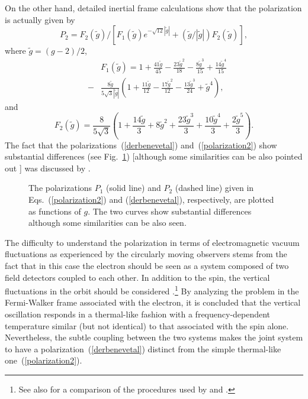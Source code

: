 \documentclass[12pt,nofootinbib,floatfix,aps,prd,showpacs,amsmath,amssymb,eqsecnum]{revtex4-2}
\let\cite\citep
\begin{document}
On the other hand, detailed inertial frame
calculations \cite{Derbenevetal73, Jackson76} 
show that the polarization is actually given by 
\begin{equation}
P_2= 
F_2(\tilde g )/
[F_1(\tilde g) e^{-\sqrt{12} |\tilde g|} + (\tilde g/|\tilde g|) F_2(\tilde g) ],
\label{derbenevetal}
\end{equation}
where 
$
\tilde g = (g-2)/2
$,
\begin{eqnarray}
& & 
F_1(\tilde g) 
= 
1+ \frac{41 \tilde g}{45} - \frac{23 \tilde g^2}{18} 
 - \frac{8 \tilde g^3}{15} +\frac{14 \tilde g^4}{15} 
\nonumber \\
& -&
\frac{8 \tilde g }{5 \sqrt{3} |\tilde g|} 
\left( 
1+ \frac{11 \tilde g }{12} - \frac{17 \tilde g^2}{12} 
 - \frac{13 \tilde g^3}{24} + \tilde g^4
\right),
\end{eqnarray}
and
\begin{equation}
F_2(\tilde g) =
\frac{8 }{5 \sqrt{3} }
\left( 
1+ \frac{14 \tilde g }{3} +8 \tilde g^2 
 + \frac{23 \tilde g^3}{3} + \frac{10 \tilde g^4}{3} +\frac{2 \tilde g^5}{3}
\right).
\end{equation}
The fact that the polarizations~(\ref{derbenevetal}) and~(\ref{polarization2})
show substantial differences (see Fig.~\ref{polarizationfig}) [although some 
similarities can be also pointed out \cite{Belletal83}] was discussed 
by \textcite{Unruh98, Unruh99}. 
\begin{figure}
\begin{center}
\mbox{}
\end{center}
\caption{The polarizations $P_1$ (solid line) and $P_2$ (dashed line) given 
in Eqs.~(\ref{polarization2}) and (\ref{derbenevetal}), respectively, are 
plotted as functions of $g$. The two curves show substantial differences
although some similarities can be also seen.}
\label{polarizationfig}
\end{figure}
The difficulty to understand the polarization 
in terms of electromagnetic vacuum fluctuations as experienced 
by the circularly moving observers stems from the fact that 
in this case the electron should be seen as a system composed of two 
field detectors coupled to each other. In addition 
to the spin, the vertical fluctuations in the orbit should be
considered \cite{Belletal87, Leinaas99, Leinaas02}.\footnote{ 
See also \textcite{Barberetal88} for a comparison 
of the procedures used by \textcite{Belletal87} and 
\textcite{Derbenevetal73}.                                }  
By analyzing the problem in the Fermi-Walker frame associated 
with the electron, it is concluded that the vertical oscillation 
responds in a thermal-like 
fashion with a frequency-dependent 
temperature similar (but not identical) 
to that associated with the spin alone. 
Nevertheless, the subtle coupling between the two systems makes
the joint system to have a polarization~(\ref{derbenevetal})
distinct from the simple thermal-like one~(\ref{polarization2}). 
\end{document}
